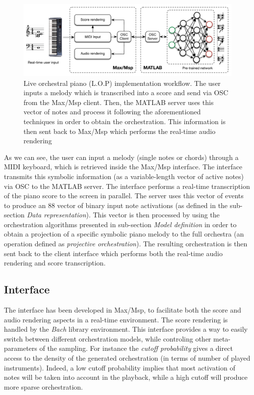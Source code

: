 \documentclass{article}
\begin{document}
\begin{figure}
\begin{centering}
\includegraphics[scale=0.55]{workflow}
\par\end{centering}
\caption{\label{fig:Live-orchestral-piano}Live orchestral piano (L.O.P) implementation
workflow. The user inputs a melody which is transcribed into a score
and send via OSC from the Max/Msp client. Then, the MATLAB server
uses this vector of notes and process it following the aforementioned
techniques in order to obtain the orchestration. This information
is then sent back to Max/Msp which performs the real-time audio rendering }
\end{figure}

As we can see, the user can input a melody (single notes or chords)
through a MIDI keyboard, which is retrieved inside the Max/Msp interface.
The interface transmits this symbolic information (as a variable-length
vector of active notes) via OSC to the MATLAB server. The interface
performs a real-time transcription of the piano score to the screen
in parallel. The server uses this vector of events to produce an 88
vector of binary input note activations (as defined in the sub-section \textit{Data representation}).
This vector is then processed by using the orchestration algorithms
presented in sub-section \textit{Model definition} in order to obtain a projection
of a specific symbolic piano melody to the full orchestra (an operation
defined as \emph{projective orchestration}). The resulting orchestration
is then sent back to the client interface which performs both the
real-time audio rendering and score transcription. 

\subsection{Interface}
The interface has been developed in Max/Msp, to facilitate both the
score and audio rendering aspects in a real-time environment. The
score rendering is handled by the \emph{Bach} library environment. 
This interface provides a way to easily switch between different orchestration models, while controling other
meta-parameters of the sampling. For instance the \emph{cutoff probability
}gives a direct access to the density of the generated orchestration
(in terms of number of played instruments). Indeed, a low cutoff probability
implies that most activation of notes will be taken into account in
the playback, while a high cutoff will produce more sparse orchestration.
\end{document}
